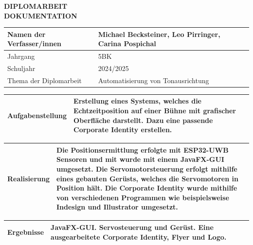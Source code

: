 \begin{center}
 \LARGE \textbf{DIPLOMARBEIT}\\
 \Large \textbf{DOKUMENTATION}\\
 \normalsize
\end{center}


\newlength{\feldC}
\newlength{\feldD}

\linespread{1.1} \normalsize
\begin{tabular}{|p{\feldC}|p{\feldD}|}
 \hline
 Namen der Verfasser/innen & Michael Becksteiner, Leo Pirringer, Carina Pospichal\\ 
 \hline 
 Jahrgang & 5BK \\ Schuljahr & 2024/2025 \\
 \hline
 Thema der Diplomarbeit & Automatisierung von Tonausrichtung\\
 \hline
\end{tabular}

\begin{tabular}{|p{\feldC}|p{\feldD}|}
 \hline
 Aufgabenstellung & Erstellung eines Systems, welches die Echtzeitposition auf einer Bühne mit grafischer Oberfläche darstellt. Dazu eine passende Corporate Identity erstellen. \\
 \hline
\end{tabular}

\begin{tabular}{|p{\feldC}|p{\feldD}|}
 \hline
 Realisierung & Die Positionsermittlung erfolgte mit ESP32-UWB Sensoren und mit wurde mit einem JavaFX-GUI umgesetzt. Die Servomotorsteuerung erfolgt mithilfe eines gebauten Gerüsts, welches die Servomotoren in Position hält. Die Corporate Identity wurde mithilfe von verschiedenen Programmen wie beispielsweise Indesign und Illustrator umgesetzt.\\
 \hline
\end{tabular}

\begin{tabular}{|p{\feldC}|p{\feldD}|}
 \hline
 Ergebnisse & JavaFX-GUI. Servosteuerung und Gerüst. Eine ausgearbeitete Corporate Identity, Flyer und Logo.\\
 \hline
\end{tabular}

